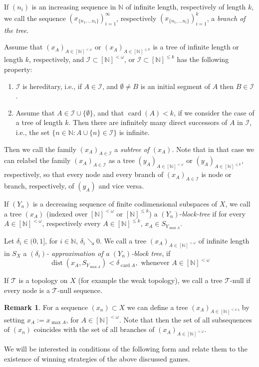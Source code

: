 \documentclass[11pt,leqno]{amsart}
\theoremstyle{definition}
\newtheorem*{remark}{Remark}
\newcommand{\dist}{\operatorname{dist}}
\newcommand{\card}{\operatorname{card}}
\newcommand{\cT}{\mathcal{T}}
\newcommand{\cI}{\mathcal{I}}
\newcommand{\N}{\mathbb{N}}
\newcommand{\fN}{[\N]^{<\omega}}
\newcommand{\kN}{[\N]^{\le k}}
\begin{document}
If $(n_i)$ is an increasing sequence in $\N$ of infinite length, 
respectively of length $k$, we call the sequence
$(x_{\{n_1,\ldots n_i\}})_{i=1}^\infty$, respectively  
$(x_{\{n_1,\ldots n_i\}})_{i=1}^k$, a {\em branch of the tree\/}.
 
Assume that $(x_A)_{A\in\fN}$ or $(x_A)_{A\in\kN}$ 
is a tree of infinite length or length $k$, respectively, 
and $\cI\subset\fN$, or $\cI\subset\kN$ has the following property:
\begin{enumerate}
\item[a)] $\cI$ is hereditary, i.e.,
if $A\in\cI$, and $\emptyset\ne B$ is an initial 
segment of $A$ then $B\in\cI$.
\item[b)] Assume that $A\in\cI\cup\{\emptyset\}$,
and that $\card(A)<k$, if we consider the case of a tree of length $k$. Then
there are infinitely many direct
successors of $A$ in $\cI$, i.e., 
the set $\{n\in\N:A\cup\{n\}\in\cI\}$ is infinite.
\end{enumerate}
Then we call the family $(x_A)_{A\in\cI}$ a {\em subtree of\/} $(x_A)$.
Note that in that case we can relabel the family $(x_A)_{A\in\cI}$ as 
a tree $(y_A)_{A\in\fN}$  or $(y_A)_{A\in\kN}$, respectively, so that every 
node and every branch of $(x_A)_{A\in\cI}$ is node or branch, 
respectively, of $(y_A)$ and vice versa.
   
If $(Y_n)$ is a decreasing sequence of finite codimensional subspaces of $X$, 
we call a tree $(x_A)$
(indexed over $\fN$ or $\kN$) a $(Y_n)$-{\em block-tree\/} if for every
$A\in\fN$, respectively every $A\in\kN$, $x_A\in S_{Y_{\max A}}$.
   
Let $\delta_i\in(0,1]$, for $i\in\N$, $\delta_i\searrow 0$. 
We call a   tree $(x_A)_{A\in\fN}$ of infinite length in $S_X$ a 
{\em $(\delta_i)$- approximation of a $(Y_n)$-block tree\/}, if 
$$\dist(x_A, S_{Y_{\max A}})<\delta_{\card A}, \text{ whenever }A\in\fN$$
  
If $\cT$ is a topology on $X$ (for example the weak topology), we call a 
tree $\cT${-null} if every node is a $\cT$-null sequence. 
 
\begin{remark} 
For a sequence $(x_n)\subset X$  we can define a 
tree $(x_A)_{A\in\fN}$, by setting $x_A:=x_{\max A}$, for $A\in\fN$. 
Note that then the set of all subsequences of $(x_n)$ coincides
with  the set of all branches of $(x_A)_{A\in\fN}$.
\end{remark}
  
We will be interested in conditions of the following form 
and relate them to the existence of
winning strategies of the above discussed games.
  
\end{document}

